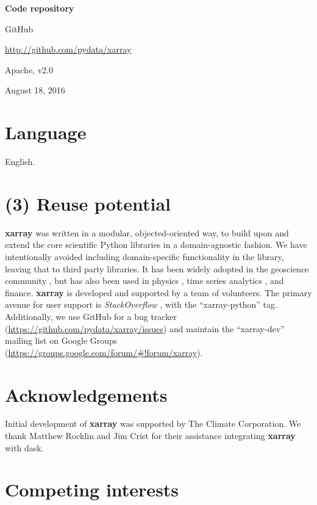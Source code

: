 \documentclass{jors}
\begin{document}
{\bf Code repository}

\begin{description}[noitemsep,topsep=0pt]
	\item[Name:] GitHub
	\item[Identifier:] \url{http://github.com/pydata/xarray}
	\item[Licence:] Apache, v2.0
	\item[Date published:] August 18, 2016
\end{description}

\section*{Language}

English.

\section*{(3) Reuse potential}

\textbf{xarray} was written in a modular, objected-oriented way, to build upon and extend the core scientific Python libraries in a domain-agnostic fashion.
We have intentionally avoided including domain-specific functionality in the library, leaving that to third party libraries.
It has been widely adopted in the geoscience community \citep[e.g.][]{xgcm,Dawson_2016a,Dawson_2016b}, but has also been used in physics \citep[e.g.][]{pycalphad}, time series analytics \citep{cesium}, and finance.
\textbf{xarray} is developed and supported by a team of volunteers. The primary avenue for user support is \textit{StackOverflow} \citep{stackoverflow}, with the ``xarray-python'' tag.
Additionally, we use GitHub for a bug tracker (\url{https://github.com/pydata/xarray/issues}) and maintain the ``xarray-dev'' mailing list on Google Groups (\url{https://groups.google.com/forum/#!forum/xarray}).

\section*{Acknowledgements}

Initial development of \textbf{xarray} was supported by The Climate Corporation.
We thank Matthew Rocklin and Jim Crist for their assistance integrating \textbf{xarray}
with dask.

\section*{Competing interests}
\end{document}
